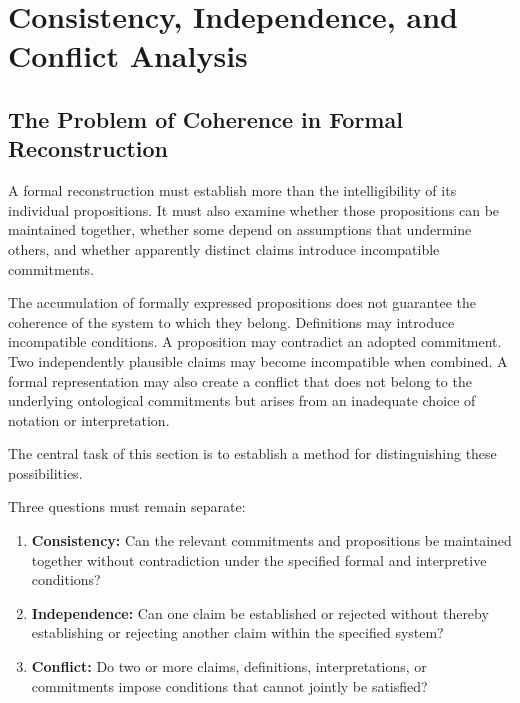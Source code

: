 
\section{Consistency, Independence, and Conflict Analysis}
\label{sec:consistency-independence-and-conflict-analysis}

\subsection{The Problem of Coherence in Formal Reconstruction}

A formal reconstruction must establish more than the intelligibility
of its individual propositions. It must also examine whether those
propositions can be maintained together, whether some depend on
assumptions that undermine others, and whether apparently distinct
claims introduce incompatible commitments.

The accumulation of formally expressed propositions does not
guarantee the coherence of the system to which they belong.
Definitions may introduce incompatible conditions. A proposition
may contradict an adopted commitment. Two independently plausible
claims may become incompatible when combined. A formal
representation may also create a conflict that does not belong
to the underlying ontological commitments but arises from an
inadequate choice of notation or interpretation.

The central task of this section is to establish a method for
distinguishing these possibilities.

Three questions must remain separate:

\begin{enumerate}
    \item \textbf{Consistency:} Can the relevant commitments and
    propositions be maintained together without contradiction
    under the specified formal and interpretive conditions?

    \item \textbf{Independence:} Can one claim be established or
    rejected without thereby establishing or rejecting another
    claim within the specified system?

    \item \textbf{Conflict:} Do two or more claims, definitions,
    interpretations, or commitments impose conditions that
    cannot jointly be satisfied?
\end{enumerate}

